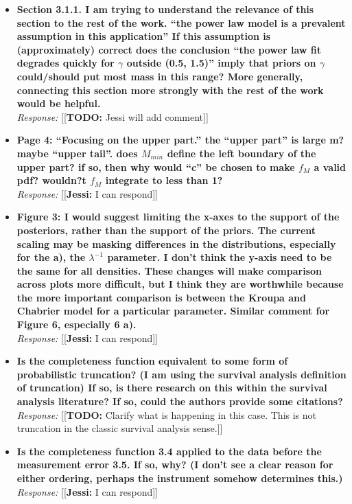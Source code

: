 \documentclass[11pt, oneside]{article}   	%
\newcommand{\jessi}[1]{{\color{blue}[[\textbf{Jessi: }#1]]}}
\newcommand{\todo}[1]{{\color{red}[[\textbf{TODO: }#1]]}}
\begin{document}
\begin{itemize}
\item  {\bf Section 3.1.1. I am trying to understand the relevance of this section to the rest of the work. ``the power law model is a prevalent assumption in this application'' If this assumption is (approximately) correct does the conclusion ``the power law fit degrades quickly for $\gamma$ outside (0.5, 1.5)'' imply that priors on $\gamma$ could/should put most mass in this range? More generally, connecting this section more strongly with the rest of the work would be helpful.} \\
\noindent \emph{Response:} \todo{Jessi will add comment}
\bigskip

\item {\bf Page 4: ``Focusing on the upper part.'' the ``upper part'' is large m? maybe ``upper tail''. does $M_{min}$ define the left boundary of the upper part? if so, then why would ``c'' be chosen to make $f_M$ a valid pdf? wouldn?t $f_M$ integrate to less than 1?} \\
\noindent \emph{Response:} \jessi{I can respond}
\bigskip

\item {\bf Figure 3: I would suggest limiting the x-axes to the support of the posteriors, rather than the support of the priors. The current scaling may be masking differences in the
distributions, especially for the a), the $\lambda^{-1}$ parameter. I don't think the y-axis need to be the same for all densities. These changes will make comparison across plots more difficult, but I think they are worthwhile because the more important comparison is between the Kroupa and Chabrier model for a particular parameter. Similar comment for Figure 6, especially 6 a).} \\
\noindent \emph{Response:} \jessi{I can respond}
\bigskip

\item {\bf Is the completeness function equivalent to some form of probabilistic truncation? (I am using the survival analysis definition of truncation) If so, is there research on this within the survival analysis literature? If so, could the authors provide some citations?} \\
\noindent \emph{Response:} \todo{Clarify what is happening in this case. This is not truncation in the classic survival analysis sense.}
\bigskip

\item {\bf Is the completeness function 3.4 applied to the data before the measurement error 3.5. If so, why? (I don't see a clear reason for either ordering, perhaps the instrument somehow determines this.)} \\
\noindent \emph{Response:} \jessi{I can respond}
\bigskip


\end{itemize}
\end{document}
